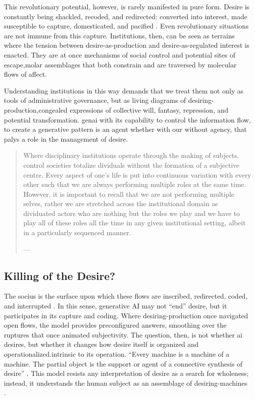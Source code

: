 This revolutionary potential, however, is rarely manifested in pure form. Desire is constantly being shackled, recoded, and redirected: converted into interest, made susceptible to capture, domesticated, and pacified \parencite[11]{buchanan2008b}. Even revolutionary situations are not immune from this capture. Institutions, then, can be seen as terrains where the tension between desire-as-production and desire-as-regulated interest is enacted. They are at once mechanisms of social control and potential sites of escape,molar assemblages that both constrain and are traversed by molecular flows of affect.

Understanding institutions in this way demands that we treat them not only as tools of administrative governance, but as living diagrams of desiring-production,congealed expressions of collective will, fantasy, repression, and potential transformation. \Gls{genai} with its capability to control the information flow, to create a generative pattern is an agent whether with our without agency, that palys a role in the management of desire.


\begin{quote}
	Where disciplinary institutions operate through the making of subjects,  control societies totalize dividuals without the formation of a subjective centre.  Every aspect of one’s life is put into continuous variation with every other such  that we are always performing multiple roles at the same time. However, it is  important to recall that we are not performing multiple selves, rather we are  stretched across the institutional domain as dividuated actors who are nothing  but the roles we play and we have to play all of these roles all the time in any given  institutional setting, albeit in a particularly sequenced manner.

	— \cite[14]{mackenzie2021}
\end{quote}



\subsection{Killing of the Desire?}

The socius is the surface upon which these flows are inscribed, redirected, coded, and interrupted \parencite[11–13]{deleuze1983}. In this sense, generative AI may not “end” desire, but it participates in its capture and coding. Where desiring-production once navigated open flows, the model provides preconfigured answers, smoothing over the ruptures that once animated subjectivity. The question, then, is not whether \gls{ai} desires, but whether it changes how desire itself is organized and operationalized.intrinsic to its operation. “Every machine is a machine of a machine. The partial object is the support or agent of a connective synthesis of desire” \parencite[6]{deleuze1983}. This model resists any interpretation of desire as a search for wholeness; instead, it understands the human subject as an assemblage of desiring-machines \parencite[10]{deleuze1983}.

